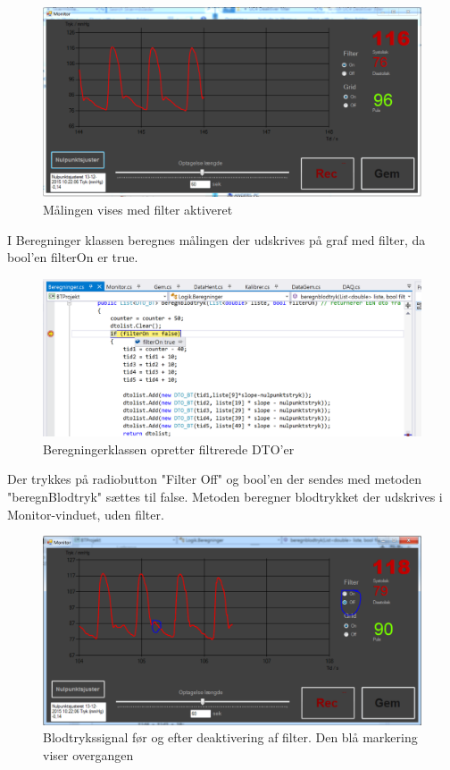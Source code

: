 \begin{figure}[H]
	\centering
	\includegraphics[width=1\textwidth]{Figurer/Test_Deaktiver_1}
	\caption{Målingen vises med filter aktiveret}
\end{figure}

I Beregninger klassen beregnes målingen der udskrives på graf med filter, da bool'en filterOn er true.

\begin{figure}[H]
	\centering
	\includegraphics[width=1\textwidth]{Figurer/Test_Deaktiver_2}
	\caption{Beregningerklassen opretter filtrerede DTO'er}
\end{figure}

Der trykkes på radiobutton "Filter Off" og bool'en der sendes med metoden "beregnBlodtryk" sættes til false. Metoden beregner blodtrykket der udskrives i Monitor-vinduet, uden filter.

\begin{figure}[H]
	\centering
	\includegraphics[width=1\textwidth]{Figurer/Test_Deaktiver_3}
	\caption{Blodtrykssignal før og efter deaktivering af filter. Den blå markering viser overgangen}
\end{figure}

